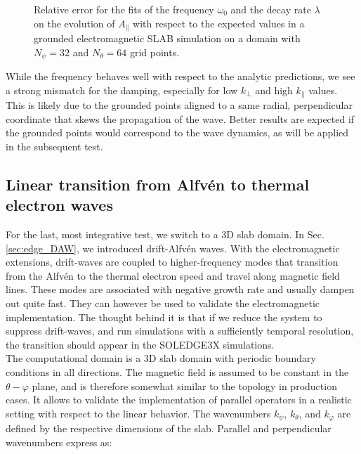 \begin{figure}[H]
\begin{subfigure}[b]{0.45\textwidth}
		\label{fig:electromagneticSLAB_errorGrounded_kPerp_fixed}
	\end{subfigure}
	\caption[Relative error for the fits of the frequency $\omega_0$ and the decay rate $\lambda$ on the evolution of $A_\parallel$]{Relative error for the fits of the frequency $\omega_0$ and the decay rate $\lambda$ on the evolution of $A_\parallel$ with respect to the expected values in a grounded electromagnetic SLAB simulation on a domain with $N_\psi=32$ and $N_\theta=64$ grid points.}
	\label{fig:electromagneticSLAB_errorGrounded}
\end{figure}

While the frequency behaves well with respect to the analytic predictions, we see a strong mismatch for the damping, especially for low $k_\perp$ and high $k_\parallel$ values. This is likely due to the grounded points aligned to a same radial, perpendicular coordinate that skews the propagation of the wave. Better results are expected if the grounded points would correspond to the wave dynamics, as will be applied in the subsequent test.


\subsection{Linear transition from Alfvén to thermal electron waves}

For the last, most integrative test, we switch to a 3D slab domain. In Sec. \ref{sec:edge_DAW}, we introduced drift-Alfvén waves. With the electromagnetic extensions, drift-waves are coupled to higher-frequency modes that transition from the Alfvén to the thermal electron speed and travel along magnetic field lines. These modes are associated with negative growth rate and usually dampen out quite fast. They can however be used to validate the electromagnetic implementation. The thought behind it is that if we reduce the system to suppress drift-waves, and run simulations with a sufficiently temporal resolution, the transition should appear in the SOLEDGE3X simulations. \\

The computational domain is a 3D slab domain with periodic boundary conditions in all directions. The magnetic field is assumed to be constant in the $\theta-\varphi$ plane, and is therefore somewhat similar to the topology in production cases. It allows to validate the implementation of parallel operators in  a realistic setting with respect to the linear behavior. The wavenumbers $k_\psi$, $k_\theta$, and $k_\varphi$ are defined by the respective dimensions of the slab. Parallel and perpendicular wavenumbers express as: \newline


